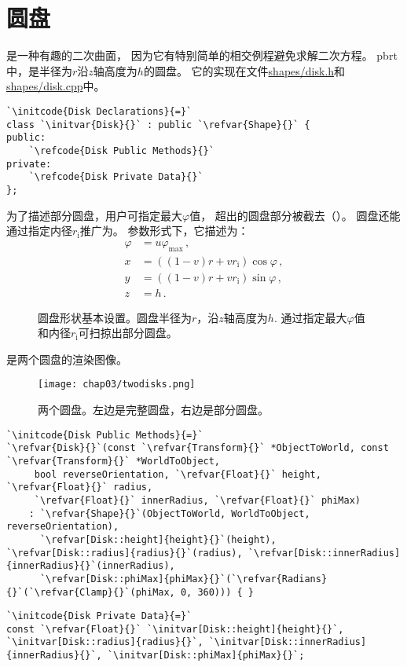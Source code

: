 \section{圆盘}\label{sec:圆盘}

是一种有趣的二次曲面，
因为它有特别简单的相交例程避免求解二次方程。
pbrt中，是半径为$r$沿$z$轴高度为$h$的圆盘。
它的实现在文件\href{https://github.com/mmp/pbrt-v3/tree/master/src/shapes/disk.h}{\ttfamily shapes/disk.h}和
\href{https://github.com/mmp/pbrt-v3/tree/master/src/shapes/disk.cpp}{\ttfamily shapes/disk.cpp}中。
\begin{lstlisting}
`\initcode{Disk Declarations}{=}`
class `\initvar{Disk}{}` : public `\refvar{Shape}{}` {
public:
    `\refcode{Disk Public Methods}{}`
private:
    `\refcode{Disk Private Data}{}`
};
\end{lstlisting}

为了描述部分圆盘，用户可指定最大$\varphi$值，
超出的圆盘部分被截去（）。
圆盘还能通过指定内径$r_{\mathrm{i}}$推广为。
参数形式下，它描述为：
\begin{align*}
    \varphi & =u\varphi_{\max}\, ,                     \\
    x       & =((1-v)r+vr_{\mathrm{i}})\cos\varphi\, , \\
    y       & =((1-v)r+vr_{\mathrm{i}})\sin\varphi\, , \\
    z       & =h\, .
\end{align*}
\begin{figure}[htbp]
    \centering
    \caption{圆盘形状基本设置。圆盘半径为$r$，沿$z$轴高度为$h$.
        通过指定最大$\varphi$值和内径$r_{\mathrm{i}}$可扫掠出部分圆盘。}
    \label{fig:3.8}
\end{figure}

是两个圆盘的渲染图像。
\begin{figure}[htbp]
    \centering\texttt{[image: chap03/twodisks.png]}
    \caption{两个圆盘。左边是完整圆盘，右边是部分圆盘。}
    \label{fig:3.9}
\end{figure}
\begin{lstlisting}
`\initcode{Disk Public Methods}{=}`
`\refvar{Disk}{}`(const `\refvar{Transform}{}` *ObjectToWorld, const `\refvar{Transform}{}` *WorldToObject,
     bool reverseOrientation, `\refvar{Float}{}` height, `\refvar{Float}{}` radius,
     `\refvar{Float}{}` innerRadius, `\refvar{Float}{}` phiMax)
    : `\refvar{Shape}{}`(ObjectToWorld, WorldToObject, reverseOrientation),
      `\refvar[Disk::height]{height}{}`(height), `\refvar[Disk::radius]{radius}{}`(radius), `\refvar[Disk::innerRadius]{innerRadius}{}`(innerRadius),
      `\refvar[Disk::phiMax]{phiMax}{}`(`\refvar{Radians}{}`(`\refvar{Clamp}{}`(phiMax, 0, 360))) { }
\end{lstlisting}
\begin{lstlisting}
`\initcode{Disk Private Data}{=}`
const `\refvar{Float}{}` `\initvar[Disk::height]{height}{}`, `\initvar[Disk::radius]{radius}{}`, `\initvar[Disk::innerRadius]{innerRadius}{}`, `\initvar[Disk::phiMax]{phiMax}{}`;
\end{lstlisting}

